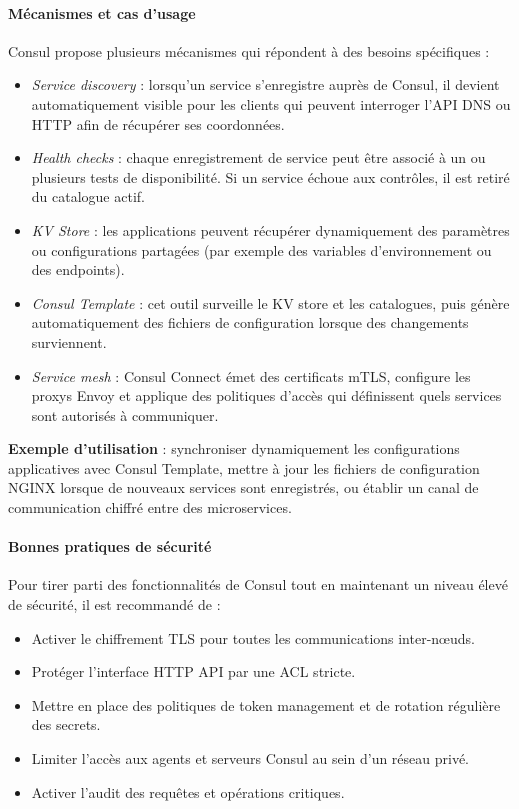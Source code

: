 \paragraph{Mécanismes et cas d’usage}

Consul propose plusieurs mécanismes qui répondent à des besoins spécifiques :

\begin{itemize}
	\item \emph{Service discovery} : lorsqu’un service s’enregistre auprès de Consul, il devient automatiquement visible pour les clients qui peuvent interroger l’API DNS ou HTTP afin de récupérer ses coordonnées.
	\item \emph{Health checks} : chaque enregistrement de service peut être associé à un ou plusieurs tests de disponibilité. Si un service échoue aux contrôles, il est retiré du catalogue actif.
	\item \emph{KV Store} : les applications peuvent récupérer dynamiquement des paramètres ou configurations partagées (par exemple des variables d’environnement ou des endpoints).
	\item \emph{Consul Template} : cet outil surveille le KV store et les catalogues, puis génère automatiquement des fichiers de configuration lorsque des changements surviennent.
	\item \emph{Service mesh} : Consul Connect émet des certificats mTLS, configure les proxys Envoy et applique des politiques d’accès qui définissent quels services sont autorisés à communiquer.
\end{itemize}

\textbf{Exemple d’utilisation} : synchroniser dynamiquement les configurations applicatives avec Consul Template, mettre à jour les fichiers de configuration NGINX lorsque de nouveaux services sont enregistrés, ou établir un canal de communication chiffré entre des microservices.

\paragraph{Bonnes pratiques de sécurité}

Pour tirer parti des fonctionnalités de Consul tout en maintenant un niveau élevé de sécurité, il est recommandé de :
\begin{itemize}
	\item Activer le chiffrement TLS pour toutes les communications inter-nœuds.
	\item Protéger l’interface HTTP API par une ACL stricte.
	\item Mettre en place des politiques de token management et de rotation régulière des secrets.
	\item Limiter l’accès aux agents et serveurs Consul au sein d’un réseau privé.
	\item Activer l’audit des requêtes et opérations critiques.
\end{itemize}


